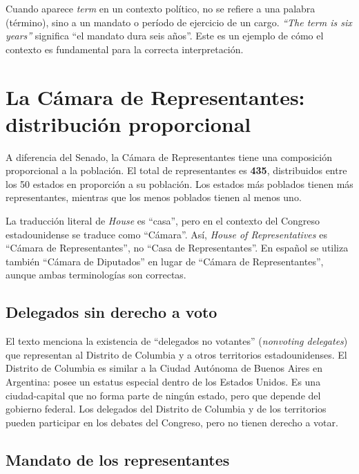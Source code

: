 \documentclass[12pt,oneside]{book}
\begin{document}
\begin{note}
Cuando aparece \textit{term} en un contexto político, no se refiere a una palabra (término), sino a un mandato o período de ejercicio de un cargo. \textit{``The term is six years''} significa ``el mandato dura seis años''. Este es un ejemplo de cómo el contexto es fundamental para la correcta interpretación.
\end{note}

\section{La Cámara de Representantes: distribución proporcional}

A diferencia del Senado, la Cámara de Representantes tiene una composición proporcional a la población. El total de representantes es \textbf{435}, distribuidos entre los 50 estados en proporción a su población. Los estados más poblados tienen más representantes, mientras que los menos poblados tienen al menos uno.

\begin{note}
La traducción literal de \textit{House} es ``casa'', pero en el contexto del Congreso estadounidense se traduce como ``Cámara''. Así, \textit{House of Representatives} es ``Cámara de Representantes'', no ``Casa de Representantes''. En español se utiliza también ``Cámara de Diputados'' en lugar de ``Cámara de Representantes'', aunque ambas terminologías son correctas.
\end{note}

\subsection{Delegados sin derecho a voto}

El texto menciona la existencia de ``delegados no votantes'' (\textit{nonvoting delegates}) que representan al Distrito de Columbia y a otros territorios estadounidenses. El Distrito de Columbia es similar a la Ciudad Autónoma de Buenos Aires en Argentina: posee un estatus especial dentro de los Estados Unidos. Es una ciudad-capital que no forma parte de ningún estado, pero que depende del gobierno federal. Los delegados del Distrito de Columbia y de los territorios pueden participar en los debates del Congreso, pero no tienen derecho a votar.

\subsection{Mandato de los representantes}
\end{document}
